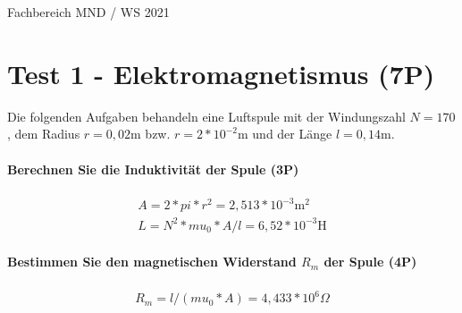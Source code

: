 \documentclass{article}
\begin{document}
Fachbereich MND / WS 2021


\part*{Test 1 - Elektromagnetismus (7P)}

Die folgenden Aufgaben behandeln eine Luftspule mit der Windungszahl $N=170$, dem Radius $r=0{,}02$m bzw. $r=2*10^{ -2 }$m und der Länge $l=0{,}14$m.

\subsection*{Berechnen Sie die Induktivität der Spule (3P)}


\begin{gather}
A=2 * pi * r ^ 2=2{,}513*10^{-3}\text{m}^2 \\
L=N ^ 2 * mu_0 * A / l=6{,}52*10^{-3}\text{H}
\end{gather}

\subsection*{Bestimmen Sie den magnetischen Widerstand $R_{m}$ der Spule (4P)}


\begin{gather}
R_{m}=l / (mu_0 * A)=4{,}433*10^{6}\Omega
\end{gather}
\end{document}
